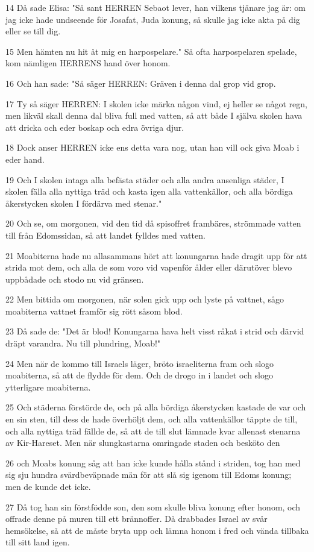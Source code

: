 \par 14 Då sade Elisa: "Så sant HERREN Sebaot lever, han vilkens tjänare jag är: om jag icke hade undseende för Josafat, Juda konung, så skulle jag icke akta på dig eller se till dig.
\par 15 Men hämten nu hit åt mig en harpospelare." Så ofta harpospelaren spelade, kom nämligen HERRENS hand över honom.
\par 16 Och han sade: "Så säger HERREN: Gräven i denna dal grop vid grop.
\par 17 Ty så säger HERREN: I skolen icke märka någon vind, ej heller se något regn, men likväl skall denna dal bliva full med vatten, så att både I själva skolen hava att dricka och eder boskap och edra övriga djur.
\par 18 Dock anser HERREN icke ens detta vara nog, utan han vill ock giva Moab i eder hand.
\par 19 Och I skolen intaga alla befästa städer och alla andra ansenliga städer, I skolen fälla alla nyttiga träd och kasta igen alla vattenkällor, och alla bördiga åkerstycken skolen I fördärva med stenar."
\par 20 Och se, om morgonen, vid den tid då spisoffret frambäres, strömmade vatten till från Edomssidan, så att landet fylldes med vatten.
\par 21 Moabiterna hade nu allasammans hört att konungarna hade dragit upp för att strida mot dem, och alla de som voro vid vapenför ålder eller därutöver blevo uppbådade och stodo nu vid gränsen.
\par 22 Men bittida om morgonen, när solen gick upp och lyste på vattnet, sågo moabiterna vattnet framför sig rött såsom blod.
\par 23 Då sade de: "Det är blod! Konungarna hava helt visst råkat i strid och därvid dräpt varandra. Nu till plundring, Moab!"
\par 24 Men när de kommo till Israels läger, bröto israeliterna fram och slogo moabiterna, så att de flydde för dem. Och de drogo in i landet och slogo ytterligare moabiterna.
\par 25 Och städerna förstörde de, och på alla bördiga åkerstycken kastade de var och en sin sten, till dess de hade överhöljt dem, och alla vattenkällor täppte de till, och alla nyttiga träd fällde de, så att de till slut lämnade kvar allenast stenarna av Kir-Hareset. Men när slungkastarna omringade staden och besköto den
\par 26 och Moabs konung såg att han icke kunde hålla stånd i striden, tog han med sig sju hundra svärdbeväpnade män för att slå sig igenom till Edoms konung; men de kunde det icke.
\par 27 Då tog han sin förstfödde son, den som skulle bliva konung efter honom, och offrade denne på muren till ett brännoffer. Då drabbades Israel av svår hemsökelse, så att de måste bryta upp och lämna honom i fred och vända tillbaka till sitt land igen.

